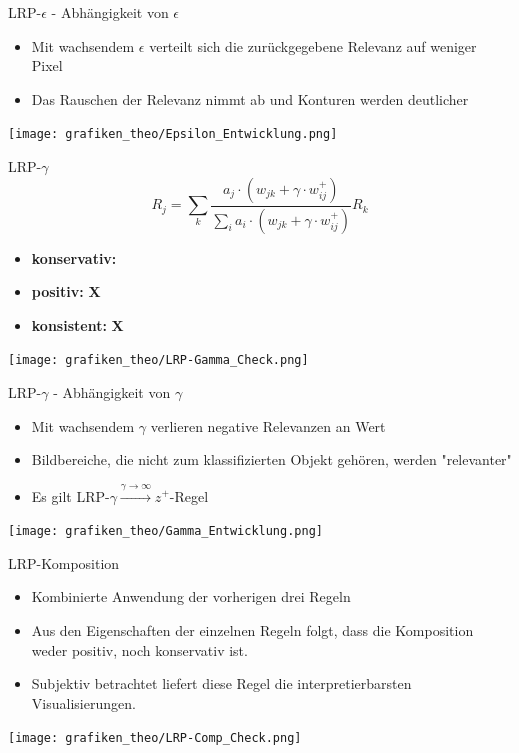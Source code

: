 \begin{frame}{LRP-$\epsilon$ - Abhängigkeit von $\epsilon$}
\begin{itemize}
\item Mit wachsendem $\epsilon$ verteilt sich die zurückgegebene Relevanz auf weniger Pixel
\item Das Rauschen der Relevanz nimmt ab und Konturen werden deutlicher
\end{itemize}
\texttt{[image: grafiken\_theo/Epsilon\_Entwicklung.png]}
\end{frame}

\begin{frame}{LRP-$\gamma$}
\begin{equation*}
R_{j}=\sum_{k} \frac{a_{j} \cdot \left(w_{j k} + \gamma \cdot w_{i j}^+ \right)}{\sum_{i} a_{i} \cdot \left(w_{j k} + \gamma \cdot w_{i j}^+ \right)} R_{k}
\end{equation*}
\begin{itemize}
\item \textbf{konservativ:} \checkmark
\item \textbf{positiv:} \hspace{0.71cm} \textbf{X}
\item \textbf{konsistent:} \hspace{0.1cm} \textbf{X}
\end{itemize}
\texttt{[image: grafiken\_theo/LRP-Gamma\_Check.png]}
\end{frame}

\begin{frame}{LRP-$\gamma$ - Abhängigkeit von $\gamma$}
\begin{itemize}
\item Mit wachsendem $\gamma$ verlieren negative Relevanzen an Wert
\item Bildbereiche, die nicht zum klassifizierten Objekt gehören, werden "relevanter" \\
\item Es gilt LRP-$\gamma \xrightarrow {\gamma \rightarrow \infty} z^+$-Regel
\end{itemize}
\texttt{[image: grafiken\_theo/Gamma\_Entwicklung.png]}
\end{frame}

\begin{frame}{LRP-Komposition}
\begin{itemize}
\item Kombinierte Anwendung der vorherigen drei Regeln
\item Aus den Eigenschaften der einzelnen Regeln folgt, dass die Komposition weder positiv, noch konservativ ist.
\item Subjektiv betrachtet liefert diese Regel die interpretierbarsten Visualisierungen.
\vspace{1cm}
\end{itemize}
\texttt{[image: grafiken\_theo/LRP-Comp\_Check.png]}
\end{frame}

